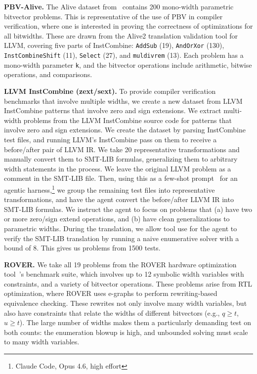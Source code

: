 \noindent\textbf{PBV-Alive.}
The Alive dataset from~\citet{bit-precise-parametric-bv} contains 200 mono-width parametric bitvector problems.
This is representative of the use of PBV in compiler verification, where one is interested in proving the correctness of optimizations for all bitwidths.
These are drawn from the Alive2 translation validation tool for LLVM,
covering five parts of InstCombine: \texttt{AddSub} (19), \texttt{AndOrXor} (130), \texttt{InstCombineShift} (11),
\texttt{Select} (27), and \texttt{muldivrem} (13).
Each problem has a mono-width parameter \texttt{k},
and the bitvector operations include arithmetic, bitwise operations, and comparisons.

\noindent\textbf{LLVM InstCombine (zext/sext).}
To provide compiler verification benchmarks that involve multiple widths, we create a new dataset from LLVM InstCombine patterns that involve zero and sign extensions.
We extract \SextZextInstcombineNumProblemsTotal{} multi-width problems
from the LLVM InstCombine source code for patterns that involve zero and sign extensions.
We create the dataset by parsing InstCombine test files, and running LLVM's InstCombine pass on them to receive a before/after pair of LLVM IR.
We take 20 representative transformations and manually convert them to SMT-LIB formulas, generalizing them to arbitrary width statements in the process.
We leave the original LLVM problem as a comment in the SMT-LIB file.
Then, using this as a few-shot prompt~\cite{brown2020language} for an agentic harness,\footnote{Claude Code, Opus 4.6, high effort}
we group the remaining test files into representative transformations, and have the agent convert the before/after LLVM IR into SMT-LIB formulas.
We instruct the agent to focus on problems that (a) have two or more zero/sign extend operations, and
(b) have clean generalizations to parametric widths. During the translation, we allow tool use for the agent
to verify the SMT-LIB translation by running a naive enumerative solver with a bound of $8$.
This gives us \SextZextInstcombineNumProblemsTotal{} problems from 1500 tests.

\noindent\textbf{ROVER.}
We take all 19 problems from the ROVER hardware optimization tool~\cite{DBLP:journals/tcad/CowardDC24}'s benchmark suite,
which involves up to 12 symbolic width variables with constraints, and a variety of bitvector operations.
These problems arise from RTL optimization, where ROVER uses e-graphs to perform rewriting-based equivalence checking.
These rewrites not only involve many width variables, but also have constraints that relate the widths of different bitvectors (e.g., $q \geq t$, $u \geq t$).
The large number of widths makes them a particularly demanding test on both counts: the enumeration blowup is high, and unbounded solving must scale to many width variables.

